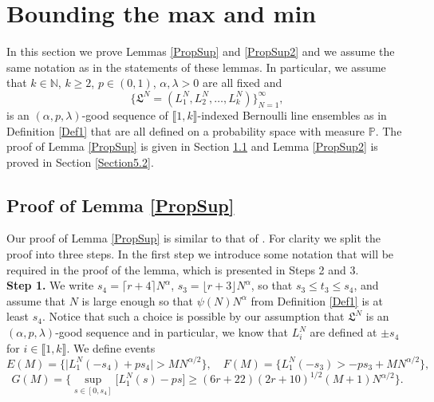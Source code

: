 %
\section{Bounding the max and min}\label{Section5}

In this section we prove Lemmas \ref{PropSup} and \ref{PropSup2} and we assume the same notation as in the statements of these lemmas. In particular, we assume that $k \in \mathbb{N}$, $k \geq 2$, $p \in (0,1)$, $\alpha, \lambda > 0$ are all fixed and 
\begin{equation*}
\big\{\mathfrak{L}^N = (L^N_1,L^N_2, \dots, L^N_k)\big\}_{N=1}^{\infty},
\end{equation*}
is an $(\alpha,p,\lambda)$-good sequence of $\llbracket 1, k\rrbracket$-indexed Bernoulli line ensembles as in Definition \ref{Def1} that are all defined on a probability space with measure $\mathbb{P}$. The proof of Lemma \ref{PropSup} is given in Section \ref{Section5.1} and Lemma \ref{PropSup2} is proved in Section \ref{Section5.2}.


%
\subsection{Proof of Lemma \ref{PropSup}}\label{Section5.1}

Our proof of Lemma \ref{PropSup} is similar to that of \cite[Lemma 5.2]{CD}. For clarity we split the proof into three steps. In the first step we introduce some notation that will be required in the proof of the lemma, which is presented in Steps 2 and 3. \\

{\bf \raggedleft Step 1.} We write $s_4 = \lceil r+4 \rceil N^\alpha$, $s_3 = \lfloor r+3 \rfloor N^\alpha$, so that $s_3 \leq t_3 \leq s_4$, and assume that $N$ is large enough so that $\psi(N)N^{\alpha}$ from Definition \ref{Def1} is at least $s_4$. Notice that such a choice is possible by our assumption that $\mathfrak{L}^N$ is an $(\alpha,p,\lambda)$-good sequence and in particular, we know that $L_i^N$ are defined at $\pm s_4$ for $i \in \llbracket 1, k \rrbracket$. We define events 
$$E(M) = \Big\{\big|L_1^N(-s_4) + ps_4\big| > MN^{\alpha/2}\Big\}, \quad F(M) = \Big\{L_1^N(-s_3) > -ps_3 + MN^{\alpha/2} \Big\},$$
$$G(M) = \Bigg\{\sup_{s\in[0,s_4]} \big[L_1^N(s) - ps \big] \geq (6r+22)(2r+10)^{1/2}(M+1)N^{\alpha/2} \Bigg\}.$$

